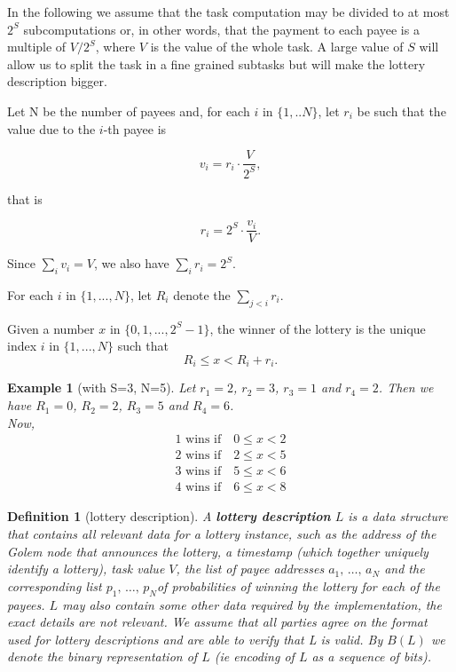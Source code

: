 \documentclass[a4paper]{article}
\newtheorem*{dfnt}{Definition}
\newtheorem*{exmp}{Example}
\begin{document}
In the following we assume that the task computation may be divided to at most $2^S$ subcomputations or, in other words,
 that the payment to each payee is a multiple of $V/2^S$, where $V$ is the value of the whole task.
 A large value of $S$ will allow us to split the task in a fine grained subtasks but will make the lottery description
 bigger.

Let N be the number of payees and, for each $i$ in $\{1, .. N\}$, let $r_i$ be such that the value due to the $i$-th
payee is

\begin{displaymath}
v_i = r_i \cdot \frac{V}{2^S},
\end{displaymath}

that is

\begin{displaymath}
r_i = 2^S \cdot \frac{v_i}{V}.
\end{displaymath}

Since $\sum_i v_i = V$, we also have $\sum_i r_i = 2^S$.

For each $i$ in $\{1, ..., N\}$, let $R_i$ denote the $\sum_{j<i} r_i$.

Given a number $x$ in $\{0, 1 ,... ,2^S-1\}$, the winner of the lottery is the unique index $i$ in $\{1, ..., N\}$
such that
\begin{displaymath}
R_i \leq x < R_i+r_i.
\end{displaymath}

\begin{exmp}[with S=3, N=5]
Let $r_1 = 2$, $r_2 = 3$, $r_3 = 1$ and $r_4 = 2$. Then we have $R_1 = 0$, $R_2 = 2$, $R_3 = 5$ and $R_4 = 6$.\\
Now, 
\begin{displaymath}
\begin{array}{c}
1 \text{ wins if} \quad 0 \leq x < 2\\
2 \text{ wins if} \quad 2 \leq x < 5\\
3 \text{ wins if} \quad 5 \leq x < 6\\
4 \text{ wins if} \quad 6 \leq x < 8
\end{array}
\end{displaymath}
\end{exmp}

\begin{dfnt}[lottery description]
A \textbf{lottery description} $L$ is a data structure that contains all relevant data for a lottery instance, such as the address of the Golem node that announces the lottery, a timestamp (which together uniquely identify a lottery), task value $V$, the list of payee addresses $a_1,\,\ldots,\, a_N$ and the corresponding list $p_1, \,\ldots,\, p_N $of probabilities of winning the lottery for each of the payees. $L$ may also contain some other data required by the implementation, the exact details are not relevant. We assume that all parties agree on the format used for lottery descriptions and are able to verify that L is valid. By $B(L)$ we denote the binary representation of $L$ (ie encoding of $L$ as a sequence of bits).
\end{dfnt}
\end{document}
